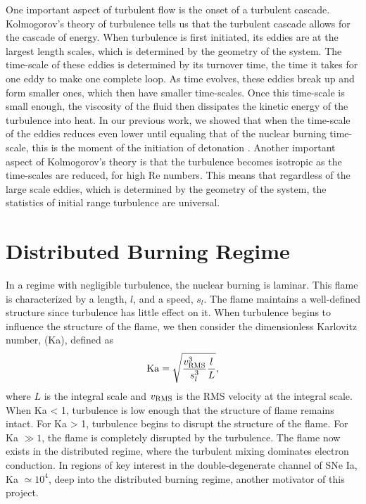 One important aspect of turbulent flow is the onset of a turbulent cascade. Kolmogorov's theory of turbulence tells us that the turbulent cascade allows for the cascade of energy. When turbulence is first initiated, its eddies are at the largest length scales, which is determined by the geometry of the system. The time-scale of these eddies is determined by its turnover time, the time it takes for one eddy to make one complete loop. As time evolves, these eddies break up and form smaller ones, which then have smaller time-scales. Once this time-scale is small enough, the viscosity of the fluid then dissipates the kinetic energy of the turbulence into heat. In our previous work, we showed that when the time-scale of the eddies reduces even lower until equaling that of the nuclear burning time-scale, this is the moment of the initiation of detonation \cite{Fisher}. Another important aspect of Kolmogorov's theory is that the turbulence becomes isotropic as the time-scales are reduced, for high Re numbers. This means that regardless of the large scale eddies, which is determined by the geometry of the system, the statistics of initial range turbulence are universal.


\section{Distributed Burning Regime}

In a regime with negligible turbulence, the nuclear burning is laminar. This flame is characterized by a length, $l$, and a speed, $s_l$. The flame maintains a well-defined structure since turbulence has little effect on it. When turbulence begins to influence the structure of the flame, we then consider the dimensionless Karlovitz number, (Ka), defined as
\begin{equation*}
	{\rm Ka} = \sqrt{\frac{v_{\rm RMS}^3}{s_l^3} \frac{l}{L}},
\end{equation*}
where $L$ is the integral scale and $v_{\rm RMS}$ is the RMS velocity at the integral scale. When Ka < 1, turbulence is low enough that the structure of flame remains intact. For Ka > 1, turbulence begins to disrupt the structure of the flame. For Ka $\gg 1$, the flame is completely disrupted by the turbulence. The flame now exists in the distributed regime, where the turbulent mixing dominates electron conduction. In regions of key interest in the double-degenerate channel of SNe Ia, Ka $\simeq 10^4$, deep into the distributed burning regime, another motivator of this project.

